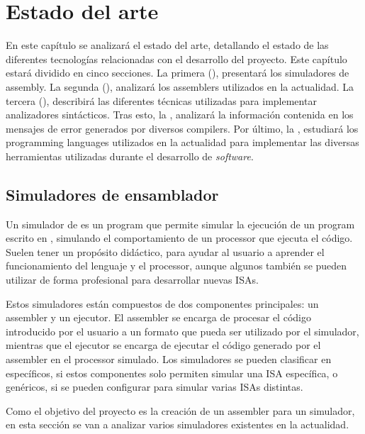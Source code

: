\chapter{Estado del arte}\label{chap:state-of-the-art}

En este capítulo se analizará el estado del arte, detallando el estado de las
diferentes tecnologías relacionadas con el desarrollo del proyecto. Este
capítulo estará dividido en cinco secciones. La primera
(), presentará los simuladores de \gls{assembly}. La
segunda (), analizará los \glspl{assembler} utilizados en
la actualidad. La tercera (), describirá las
diferentes técnicas utilizadas para implementar analizadores sintácticos. Tras
esto, la , analizará la información contenida en los
mensajes de error generados por diversos \glspl{compiler}. Por último, la
, estudiará los \glspl{programming language}
utilizados en la actualidad para implementar las diversas herramientas
utilizadas durante el desarrollo de \textit{software}.

\section{Simuladores de ensamblador}\label{sec:simulators}

Un simulador de  es un \gls{program} que permite
simular la ejecución de un \gls{program} escrito en ,
simulando el comportamiento de un \gls{processor} que ejecuta el código. Suelen
tener un propósito didáctico, para ayudar al usuario a aprender el
funcionamiento del lenguaje y el \gls{processor}, aunque algunos también se
pueden utilizar de forma profesional para desarrollar nuevas \glspl{ISA}.

Estos simuladores están compuestos de dos componentes principales: un
\gls{assembler} y un ejecutor. El \gls{assembler} se encarga de procesar el
código  introducido por el usuario a un formato
que pueda ser utilizado por el simulador, mientras que el ejecutor se encarga
de ejecutar el código generado por el \gls{assembler} en el \gls{processor}
simulado. Los simuladores se pueden clasificar en específicos, si estos componentes
solo permiten simular una \gls{ISA} específica, o genéricos, si se pueden
configurar para simular varias \glspl{ISA} distintas.

Como el objetivo del proyecto es la creación de un \gls{assembler} para un
simulador, en esta sección se van a analizar varios simuladores existentes en la
actualidad.

